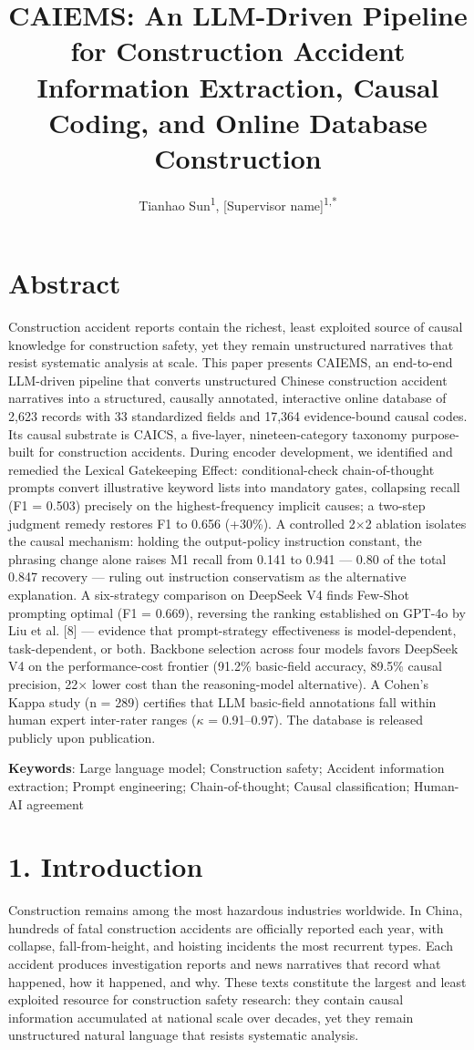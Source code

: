 \documentclass[11pt]{article}
\title{CAIEMS: An LLM-Driven Pipeline for Construction Accident Information Extraction, Causal Coding, and Online Database Construction}
\author{Tianhao Sun\textsuperscript{1}, [Supervisor name]\textsuperscript{1,*}}
\date{}
\begin{document}
\maketitle

\section{Abstract}
Construction accident reports contain the richest, least exploited source of causal knowledge for construction safety, yet they remain unstructured narratives that resist systematic analysis at scale. This paper presents CAIEMS, an end-to-end LLM-driven pipeline that converts unstructured Chinese construction accident narratives into a structured, causally annotated, interactive online database of 2,623 records with 33 standardized fields and 17,364 evidence-bound causal codes. Its causal substrate is CAICS, a five-layer, nineteen-category taxonomy purpose-built for construction accidents. During encoder development, we identified and remedied the Lexical Gatekeeping Effect: conditional-check chain-of-thought prompts convert illustrative keyword lists into mandatory gates, collapsing recall (F1 = 0.503) precisely on the highest-frequency implicit causes; a two-step judgment remedy restores F1 to 0.656 (+30\%). A controlled 2$\times$2 ablation isolates the causal mechanism: holding the output-policy instruction constant, the phrasing change alone raises M1 recall from 0.141 to 0.941 --- 0.80 of the total 0.847 recovery --- ruling out instruction conservatism as the alternative explanation. A six-strategy comparison on DeepSeek V4 finds Few-Shot prompting optimal (F1 = 0.669), reversing the ranking established on GPT-4o by Liu et al. [8] --- evidence that prompt-strategy effectiveness is model-dependent, task-dependent, or both. Backbone selection across four models favors DeepSeek V4 on the performance-cost frontier (91.2\% basic-field accuracy, 89.5\% causal precision, 22$\times$ lower cost than the reasoning-model alternative). A Cohen's Kappa study (n = 289) certifies that LLM basic-field annotations fall within human expert inter-rater ranges ($\kappa$ = 0.91--0.97). The database is released publicly upon publication.

\textbf{Keywords}: Large language model; Construction safety; Accident information extraction; Prompt engineering; Chain-of-thought; Causal classification; Human-AI agreement

\section{1. Introduction}
Construction remains among the most hazardous industries worldwide. In China, hundreds of fatal construction accidents are officially reported each year, with collapse, fall-from-height, and hoisting incidents the most recurrent types. Each accident produces investigation reports and news narratives that record what happened, how it happened, and why. These texts constitute the largest and least exploited resource for construction safety research: they contain causal information accumulated at national scale over decades, yet they remain unstructured natural language that resists systematic analysis.
\end{document}
